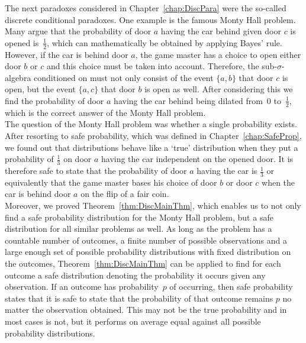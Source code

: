 \documentclass[a4paper]{report}
\theoremstyle{plain}
\theoremstyle{definition}
\theoremstyle{remark}
\numberwithin{equation}{chapter}
\DeclareMathOperator{\1}{\mathbbm{1}}
\begin{document}
The next paradoxes considered in Chapter~\ref{chap:DiscPara} were the so-called discrete conditional paradoxes. One example is the famous Monty Hall problem. Many argue that the probability of door $a$ having the car behind given door $c$ is opened is~$\frac{1}{2}$, which can mathematically be obtained by applying Bayes' rule. However, if the car is behind door $a$, the game master has a choice to open either door $b$ or $c$ and this choice must be taken into account. Therefore, the sub-$\sigma$-algebra conditioned on must not only consist of the event $\{a,b\}$ that door $c$ is open, but the event $\{a,c\}$ that door $b$ is open as well. After considering this we find the probability of door $a$ having the car behind being dilated from~$0$ to~$\frac{1}{2}$, which is the correct answer of the Monty Hall problem.\\
The question of the Monty Hall problem was whether a single probability exists. After resorting to safe probability, which was defined in Chapter~\ref{chap:SafeProp}, we found out that distributions behave like a `true' distribution when they put a probability of $\frac{1}{3}$ on door $a$ having the car independent on the opened door. It is therefore safe to state that the probability of door $a$ having the car is $\frac{1}{3}$ or equivalently that the game master bases his choice of door $b$ or door $c$ when the car is behind door $a$ on the flip of a fair coin.\\
Moreover, we proved Theorem~\ref{thm:DiscMainThm}, which enables us to not only find a safe probability distribution for the Monty Hall problem, but a safe distribution for all similar problems as well. As long as the problem has a countable number of outcomes, a finite number of possible observations and a large enough set of possible probability distributions with fixed distribution on the outcomes, Theorem~\ref{thm:DiscMainThm} can be applied to find for each outcome a safe distribution denoting the probability it occurs given any observation. If an outcome has probability~$p$ of occurring, then safe probability states that it is safe to state that the probability of that outcome remains $p$ no matter the observation obtained. This may not be the true probability and in most cases is not, but it performs on average equal against all possible probability distributions.
\end{document}
